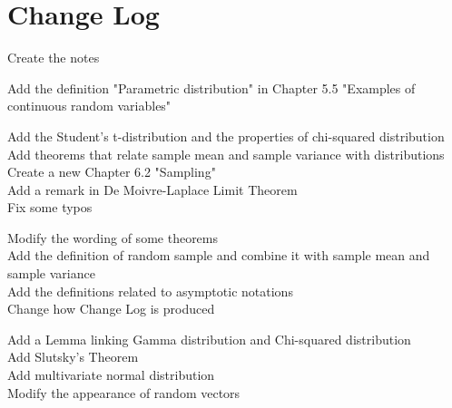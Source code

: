 \documentclass{huhtakm-template-book}
\begin{document}
\chapter*{Change Log}
\begin{description}[style=nextline]
	\item[1.0]
	Create the notes\\
	\item[1.1]
	Add the definition "Parametric distribution" in Chapter 5.5 "Examples of continuous random variables"\\
	\item[1.2]
	Add the Student's t-distribution and the properties of chi-squared distribution\\
	Add theorems that relate sample mean and sample variance with distributions\\
	Create a new Chapter 6.2 "Sampling"\\
	Add a remark in De Moivre-Laplace Limit Theorem\\
	Fix some typos\\
	\item[1.3]
	Modify the wording of some theorems\\
	Add the definition of random sample and combine it with sample mean and sample variance\\
	Add the definitions related to asymptotic notations\\
	Change how Change Log is produced\\
	\item[1.4] Add a Lemma linking Gamma distribution and Chi-squared distribution\\
	Add Slutsky's Theorem\\
	Add multivariate normal distribution\\
	Modify the appearance of random vectors
\end{description}
\end{document}
